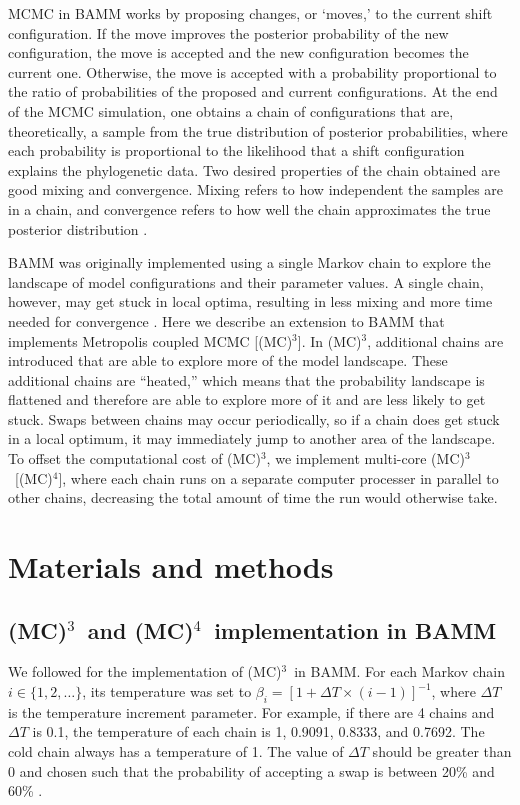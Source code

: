 \documentclass[12pt]{article}
\newcommand{\MCMCMC}{(MC)$^{3}$}
\newcommand{\MCMCMCMC}{(MC)$^{4}$}
\begin{document}
MCMC in BAMM works by proposing changes, or `moves,'
to the current shift configuration.
%
If the move improves the posterior probability of the new configuration,
the move is accepted and the new configuration becomes the current one.
%
Otherwise, the move is accepted with a probability proportional
to the ratio of probabilities of the proposed and current configurations.
%
At the end of the MCMC simulation, one obtains a chain of configurations
that are, theoretically, a sample from the true distribution
of posterior probabilities,
where each probability is proportional to the likelihood
that a shift configuration explains the phylogenetic data.
%
Two desired properties of the chain obtained are good mixing and convergence.
%
Mixing refers to how independent the samples are in a chain,
and convergence refers to how well the chain
approximates the true posterior distribution \citep{giv05}.


BAMM was originally implemented using a single Markov chain
to explore the landscape of model configurations and their parameter values.
%
A single chain, however, may get stuck in local optima,
resulting in less mixing and more time needed for convergence \citep{alt04}.
%
Here we describe an extension to BAMM
that implements Metropolis coupled MCMC [\MCMCMC].
%
In \MCMCMC, additional chains are introduced
that are able to explore more of the model landscape.
%
These additional chains are ``heated,''
which means that the probability landscape is flattened
and therefore are able to explore more of it
and are less likely to get stuck.
%
Swaps between chains may occur periodically,
so if a chain does get stuck in a local optimum,
it may immediately jump to another area of the landscape.
%
To offset the computational cost of \MCMCMC, we implement
multi-core \MCMCMC\ [\MCMCMCMC], where each chain
runs on a separate computer processer in parallel to other chains,
decreasing the total amount of time the run would otherwise take.


\section*{Materials and methods}

\subsection*{\MCMCMC\ and \MCMCMCMC\ implementation in BAMM}

We followed \citet{alt04} for the implementation of \MCMCMC\ in BAMM.
%
For each Markov chain $i \in \{1, 2, \dots\}$, its temperature was set to
$\beta_i = [1 + \Delta T \times (i - 1)]^{-1}$,
where $\Delta T$ is the temperature increment parameter.
%
For example, if there are 4 chains and $\Delta T$ is 0.1,
the temperature of each chain is 1, 0.9091, 0.8333, and 0.7692.
%
The cold chain always has a temperature of 1.
%
The value of $\Delta T$ should be greater than 0
and chosen such that the probability of accepting a swap
is between 20\% and 60\% \citep{alt04}.
\end{document}
